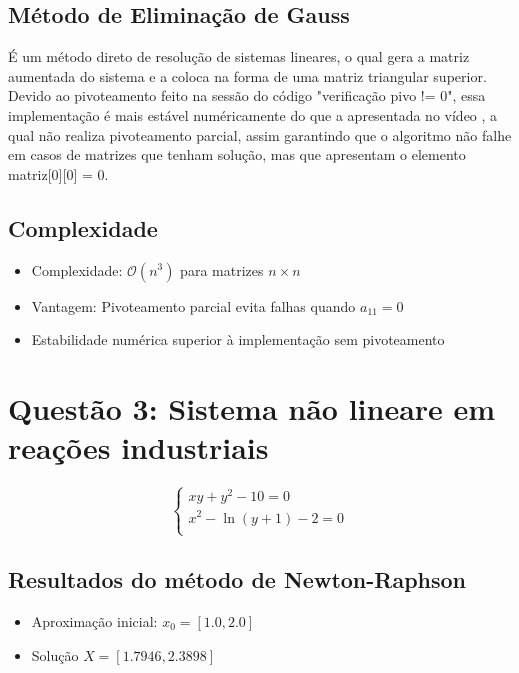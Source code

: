 \documentclass{article}
\begin{document}
\subsection*{Método de Eliminação de Gauss}
É um método direto de resolução de sistemas lineares, o qual gera a matriz aumentada do sistema e a coloca na forma de uma matriz triangular superior. Devido ao pivoteamento feito na sessão do código "verificação pivo != 0", essa implementação é mais estável numéricamente do que a apresentada no vídeo \cite{Gauss}, a qual não realiza 
pivoteamento parcial, assim garantindo que o algoritmo não falhe em casos de matrizes que tenham solução, mas que apresentam o elemento matriz[0][0] = 0.

\subsection*{Complexidade}
\begin{itemize}
\item Complexidade: $\mathcal{O}(n^3)$ para matrizes $n \times n$
\item Vantagem: Pivoteamento parcial evita falhas quando $a_{11} = 0$
\item Estabilidade numérica superior à implementação sem pivoteamento
\end{itemize}


\section*{Questão 3: Sistema não lineare em reações industriais}
\begin{equation}\label{eq:sistema}
\begin{cases}
xy + y^2 - 10 = 0 \\
x^2 - \ln(y+1) - 2 = 0 \\
\end{cases}
\end{equation}

\subsection*{Resultados do método de Newton-Raphson}



\begin{itemize}
\item Aproximação inicial: $x_0 = [1.0, 2.0]$
\item Solução $X =[1.7946, 2.3898]$
\end{itemize}
\end{document}

